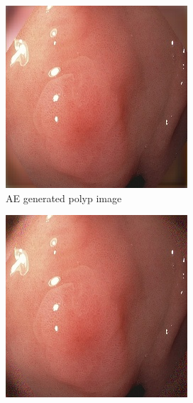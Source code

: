 \begin{figure}
\begin{subfigure}[t]{\myfigsizethree}
            \includegraphics[width=\textwidth]{experiments/figures/blackcorner/polypAE.jpg}
            \caption{AE generated polyp image}    
            \label{fig:polyp_AE_CORNER1}
        \end{subfigure}
        \qquad
        \begin{subfigure}[t]{\myfigsizethree}  
            \centering 
            \includegraphics[width=\textwidth]{experiments/figures/blackcorner/polypGAN.jpg}

\end{subfigure}
\end{figure}
